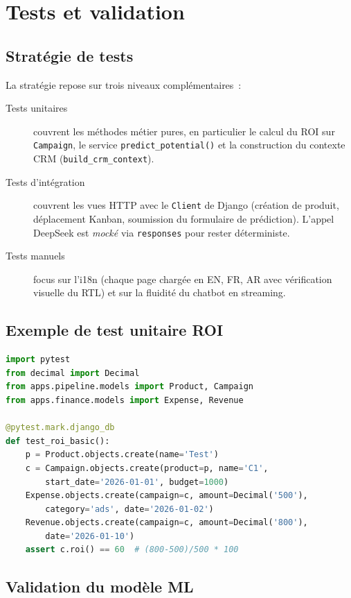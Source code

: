 \section{Tests et validation}
\label{sec:tests}

\subsection{Stratégie de tests}

La stratégie repose sur trois niveaux complémentaires~:

\begin{description}
    \item[Tests unitaires] couvrent les méthodes métier pures, en
    particulier le calcul du ROI sur \texttt{Campaign}, le service
    \texttt{predict\_potential()} et la construction du contexte CRM
    (\texttt{build\_crm\_context}).
    \item[Tests d'intégration] couvrent les vues HTTP avec le
    \texttt{Client} de Django (création de produit, déplacement Kanban,
    soumission du formulaire de prédiction). L'appel DeepSeek est
    \emph{mocké} via \texttt{responses} pour rester déterministe.
    \item[Tests manuels] focus sur l'i18n (chaque page chargée en EN,
    FR, AR avec vérification visuelle du RTL) et sur la fluidité du
    chatbot en streaming.
\end{description}

\subsection{Exemple de test unitaire ROI}

\begin{lstlisting}[language=Python,caption={tests/test\_roi.py}]
import pytest
from decimal import Decimal
from apps.pipeline.models import Product, Campaign
from apps.finance.models import Expense, Revenue

@pytest.mark.django_db
def test_roi_basic():
    p = Product.objects.create(name='Test')
    c = Campaign.objects.create(product=p, name='C1',
        start_date='2026-01-01', budget=1000)
    Expense.objects.create(campaign=c, amount=Decimal('500'),
        category='ads', date='2026-01-02')
    Revenue.objects.create(campaign=c, amount=Decimal('800'),
        date='2026-01-10')
    assert c.roi() == 60  # (800-500)/500 * 100
\end{lstlisting}

\subsection{Validation du modèle ML}


